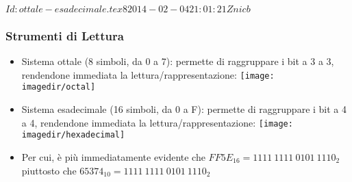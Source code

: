 %
%
%
%
%
\svnInfo $Id: ottale-esadecimale.tex 8 2014-02-04 21:01:21Z nicb $

\setcounter{ms}{0}
\begin{frame}
    \frametitle{Strumenti di Lettura}

	\begin{itemize}[<+- | alert@+->]

		\item Sistema ottale (8 simboli, da 0 a 7):
			  permette di raggruppare i bit a 3 a 3,
			  rendendone immediata la lettura/rappresentazione:
				\texttt{[image: \\imagedir/octal]}

		\item Sistema esadecimale (16 simboli, da 0 a F):
			permette di raggruppare i bit a 4 a 4,
			rendendone immediata la lettura/rappresentazione:
				\texttt{[image: \\imagedir/hexadecimal]}

		\item
			Per cui, \`e pi\`u immediatamente evidente che
			${FF5E}_{16} = {1111~1111~0101~1110}_{2}$
			piuttosto che
			$65374_{10} = {1111~1111~0101~1110}_{2}$

	\end{itemize}

\end{frame}
